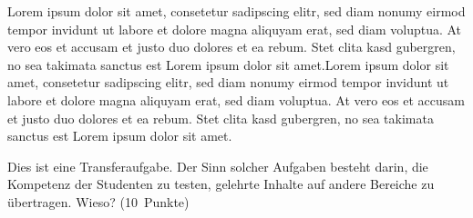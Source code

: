 \documentclass[addpoints,a4paper,ngerman,10pt,answers]{exam}
\begin{document}
\begin{questions}
\ifprintanswers
\begin{minipage}{0.7\textwidth}
\begin{solution} 
\parbox[t][][t]{.8\textwidth}{Lorem ipsum dolor sit amet, consetetur sadipscing elitr, sed diam nonumy eirmod tempor invidunt ut labore et dolore magna aliquyam erat, sed diam voluptua. At vero eos et accusam et justo duo dolores et ea rebum. Stet clita kasd gubergren, no sea takimata sanctus est Lorem ipsum dolor sit amet.Lorem ipsum dolor sit amet, consetetur sadipscing elitr, sed diam nonumy eirmod tempor invidunt ut labore et dolore magna aliquyam erat, sed diam voluptua. At vero eos et accusam et justo duo dolores et ea rebum. Stet clita kasd gubergren, no sea takimata sanctus est Lorem ipsum dolor sit amet.}
\end{solution}
\end{minipage}
\else
{}
\fi
\vspace{1cm}
\question[10] \parbox[t][][t]{0.68\textwidth}{Dies ist eine Transferaufgabe. Der Sinn solcher Aufgaben besteht darin, die Kompetenz der Studenten zu testen, gelehrte Inhalte auf andere Bereiche zu übertragen. Wieso? \linebreak(10\ Punkte)}

\ifprintanswers
\begin{minipage}{0.7\textwidth}
\begin{solution} 
\parbox[t][][t]{.8\textwidth}{}
\end{solution}
\end{minipage}
\else
{}
\fi
\vspace{1cm}



\end{questions}
\end{document}
